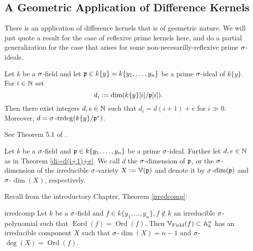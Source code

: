 \subsection{A Geometric Application of Difference Kernels}

There is an application of difference kernels that is of geometric nature. We will just quote a result for the case of reflexive prime kernels here,
and do a partial generalization for the case that arises for some non-necesarilly-reflexive prime $\sigma$-ideals.

\begin{theorem}\label{di=d(i+1)+e}
Let $k$ be a $\sigma$-field and let $\mathfrak{p} \in k\{y\} = k\{y_1,\ldots,y_n\}$ be a prime $\sigma$-ideal of $k\{y\}$. For $i \in \mathbb{N}$ set $$d_i := \dim(k\{y\}[i]/\mathfrak{p}[i]).$$
Then there exist integers $d, e \in \mathbb{N}$ such that $d_i = d(i+1) + e$ for $i \gg 0$. Moreover, $d = \sigma\operatorname{-trdeg}(k\{y\}/\mathfrak{p}^*)$.
\begin{bew}
See Theorem 5.1 of \cite{wibmer}.
\end{bew}
\end{theorem}

\begin{defn}
Let $k$ be a $\sigma$-field and $\mathfrak{p} \in k\{y_1,\ldots,y_n\}$ be a prime $\sigma$-ideal. Further let $d, e \in \mathbb{N}$ as in Theorem \ref{di=d(i+1)+e}. We call $d$ the $\sigma$-dimension of $\mathfrak{p}$, 
or the $\sigma$-dimension of the irreducible $\sigma$-variety $X:= \mathbb{V}(\mathfrak{p})$ and denote it by $\sigma$-$\dim(\mathfrak{p})$ and $\sigma$-$\dim(X)$, respectively.
\end{defn}

Recall from the introductory Chapter, Theorem \ref{irredcomp}:
\begin{reptheorem}{irredcomp}
Let $k$ be a $\sigma$-field and $f \in k\{y_1,\ldots,y_n\}, f \notin k$ an irreducible $\sigma$-polynomial such that $\operatorname{Eord}(f) = \operatorname{Ord}(f)$. Then $\mathbb{V}_{\operatorname{Field}}(f) \subset \mathbb{A}_k^n$ has an irreducible component $X$ such that $\sigma$-$\dim(X) = n-1$ and $\sigma$-$\operatorname{deg}(X) = \operatorname{Ord}(f)$.
\end{reptheorem}

